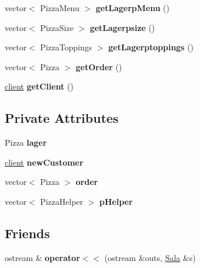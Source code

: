\begin{CompactItemize}
\item 
\hypertarget{class_sala_89b38b3e2a9835524c9fd21628f485cc}{
vector$<$ Pizza\-Menu $>$ {\bf get\-Lagerp\-Menu} ()}
\label{class_sala_89b38b3e2a9835524c9fd21628f485cc}

\item 
\hypertarget{class_sala_3b0fc00a14ac87f5c78a4ec2f508d67b}{
vector$<$ Pizza\-Size $>$ {\bf get\-Lagerpsize} ()}
\label{class_sala_3b0fc00a14ac87f5c78a4ec2f508d67b}

\item 
\hypertarget{class_sala_aeb754b87d63d395a61539294cbdf064}{
vector$<$ Pizza\-Toppings $>$ {\bf get\-Lagerptoppings} ()}
\label{class_sala_aeb754b87d63d395a61539294cbdf064}

\item 
\hypertarget{class_sala_71e41a58a2a9c2d1927676693909a42c}{
vector$<$ Pizza $>$ {\bf get\-Order} ()}
\label{class_sala_71e41a58a2a9c2d1927676693909a42c}

\item 
\hypertarget{class_sala_a1300ce1d3137fc3bd1b2938612faa1b}{
\hyperlink{classclient}{client} {\bf get\-Client} ()}
\label{class_sala_a1300ce1d3137fc3bd1b2938612faa1b}

\end{CompactItemize}
\subsection*{Private Attributes}
\begin{CompactItemize}
\item 
\hypertarget{class_sala_0f90fe5c344e62852b747ecbdc5b5d90}{
Pizza {\bf lager}}
\label{class_sala_0f90fe5c344e62852b747ecbdc5b5d90}

\item 
\hypertarget{class_sala_d6980eaf5555befe23d2271575d6d9cb}{
\hyperlink{classclient}{client} {\bf new\-Customer}}
\label{class_sala_d6980eaf5555befe23d2271575d6d9cb}

\item 
\hypertarget{class_sala_70a17ffa722a3985b86d30b034ad06d7}{
vector$<$ Pizza $>$ {\bf order}}
\label{class_sala_70a17ffa722a3985b86d30b034ad06d7}

\item 
\hypertarget{class_sala_4b1abb1f80ebc80a2334733ae62acde2}{
vector$<$ Pizza\-Helper $>$ {\bf p\-Helper}}
\label{class_sala_4b1abb1f80ebc80a2334733ae62acde2}

\end{CompactItemize}
\subsection*{Friends}
\begin{CompactItemize}
\item 
\hypertarget{class_sala_b32b27b19243c1cf7bcfffe604ea1736}{
ostream \& {\bf operator$<$$<$} (ostream \&outs, \hyperlink{class_sala}{Sala} \&s)}
\label{class_sala_b32b27b19243c1cf7bcfffe604ea1736}

\end{CompactItemize}


